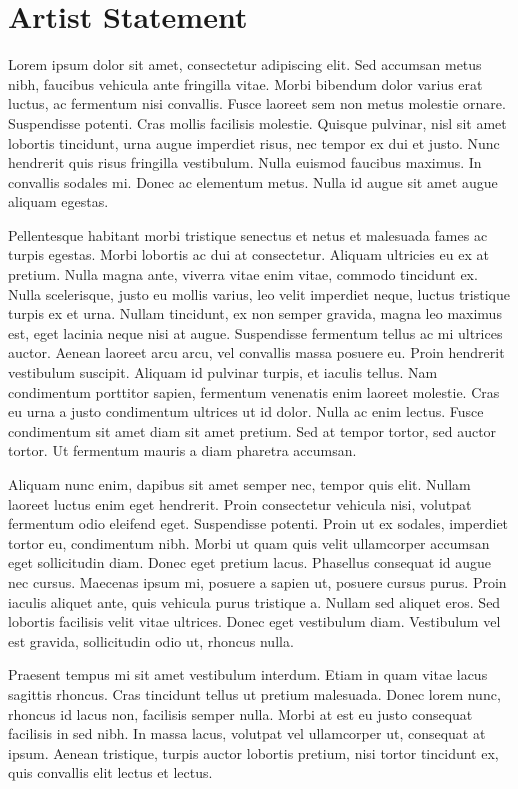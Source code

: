 \documentclass[10pt]{article}
\begin{document}
\section*{Artist Statement}
Lorem ipsum dolor sit amet, consectetur adipiscing elit. Sed accumsan metus
nibh, faucibus vehicula ante fringilla vitae. Morbi bibendum dolor varius erat
luctus, ac fermentum nisi convallis. Fusce laoreet sem non metus molestie
ornare. Suspendisse potenti. Cras mollis facilisis molestie. Quisque pulvinar,
nisl sit amet lobortis tincidunt, urna augue imperdiet risus, nec tempor ex dui
et justo. Nunc hendrerit quis risus fringilla vestibulum. Nulla euismod
faucibus maximus. In convallis sodales mi. Donec ac elementum metus. Nulla id
augue sit amet augue aliquam egestas.

Pellentesque habitant morbi tristique senectus et netus et malesuada fames ac
turpis egestas. Morbi lobortis ac dui at consectetur. Aliquam ultricies eu ex
at pretium. Nulla magna ante, viverra vitae enim vitae, commodo tincidunt ex.
Nulla scelerisque, justo eu mollis varius, leo velit imperdiet neque, luctus
tristique turpis ex et urna. Nullam tincidunt, ex non semper gravida, magna leo
maximus est, eget lacinia neque nisi at augue. Suspendisse fermentum tellus ac
mi ultrices auctor. Aenean laoreet arcu arcu, vel convallis massa posuere eu.
Proin hendrerit vestibulum suscipit. Aliquam id pulvinar turpis, et iaculis
tellus. Nam condimentum porttitor sapien, fermentum venenatis enim laoreet
molestie. Cras eu urna a justo condimentum ultrices ut id dolor. Nulla ac enim
lectus. Fusce condimentum sit amet diam sit amet pretium. Sed at tempor tortor,
sed auctor tortor. Ut fermentum mauris a diam pharetra accumsan.

Aliquam nunc enim, dapibus sit amet semper nec, tempor quis elit. Nullam
laoreet luctus enim eget hendrerit. Proin consectetur vehicula nisi, volutpat
fermentum odio eleifend eget. Suspendisse potenti. Proin ut ex sodales,
imperdiet tortor eu, condimentum nibh. Morbi ut quam quis velit ullamcorper
accumsan eget sollicitudin diam. Donec eget pretium lacus. Phasellus consequat
id augue nec cursus. Maecenas ipsum mi, posuere a sapien ut, posuere cursus
purus. Proin iaculis aliquet ante, quis vehicula purus tristique a. Nullam sed
aliquet eros. Sed lobortis facilisis velit vitae ultrices. Donec eget
vestibulum diam. Vestibulum vel est gravida, sollicitudin odio ut, rhoncus
nulla.

Praesent tempus mi sit amet vestibulum interdum. Etiam in quam vitae lacus
sagittis rhoncus. Cras tincidunt tellus ut pretium malesuada. Donec lorem nunc,
rhoncus id lacus non, facilisis semper nulla. Morbi at est eu justo consequat
facilisis in sed nibh. In massa lacus, volutpat vel ullamcorper ut, consequat
at ipsum. Aenean tristique, turpis auctor lobortis pretium, nisi tortor
tincidunt ex, quis convallis elit lectus et lectus.
\end{document}
